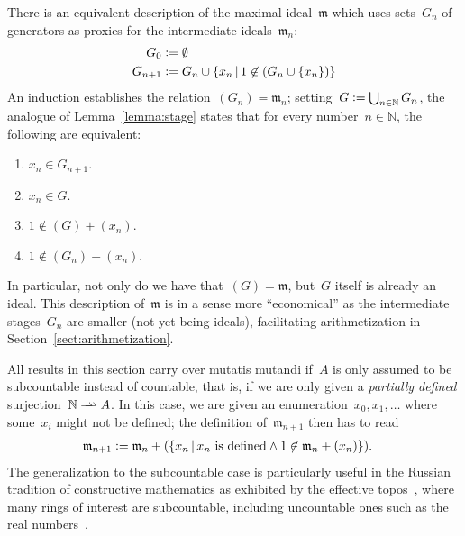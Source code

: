 \documentclass[envcountsect,envcountsame,runningheads]{llncs}
\newcommand{\mmm}{\mathfrak{m}}
\newcommand{\NN}{\mathbb{N}}
\newcommand{\defeq}{\vcentcolon=}
\renewcommand{\_}{\mathpunct{.}\,}
\begin{document}
\begin{remark}\label{rem:via-generators}There is an equivalent description of the
maximal ideal~$\mmm$ which uses sets~$G_n$ of generators as proxies for the
intermediate ideals~$\mmm_n$:
\begin{align*}
  G_0 &\defeq \emptyset \\
  G_{n+1} &\defeq G_n \cup \{ x_n \,|\, 1 \not\in (G_n \cup \{ x_n \}) \}
\end{align*}
An induction establishes the relation~$(G_n) = \mmm_n$; setting~$G \defeq
\bigcup_{n\in\NN} G_n$, the analogue of Lemma~\ref{lemma:stage} states
that for every number~$n \in \NN$, the following are equivalent:
\begin{enumerate}
\item $x_n \in G_{n+1}$.
\item $x_n \in G$.
\item $1 \not\in (G) + (x_n)$.
\item $1 \not\in (G_n) + (x_n)$.
\end{enumerate}
In particular, not only do we have that~$(G) = \mmm$, but~$G$ itself is already
an ideal. This description of~$\mmm$ is in a sense more ``economical'' as the
intermediate stages~$G_n$ are smaller (not yet being ideals), facilitating
arithmetization in Section~\ref{sect:arithmetization}.
\end{remark}

\newcommand{\rightrightharpoonup}{\mathrel{\mathrlap{\rightharpoonup}\mkern1mu\rightharpoonup}}
\begin{remark}All results in this section carry over mutatis mutandi if~$A$ is
only assumed to be subcountable instead of countable, that is, if we are only
given a \emph{partially defined} surjection~$\NN \rightrightharpoonup A$. In
this case, we are given an enumeration~$x_0,x_1,\ldots$ where some~$x_i$
might not be defined; the definition of~$\mmm_{n+1}$ then has to read
\begin{align*}
  \mmm_{n+1} &\defeq \mmm_n + (\{ x_n \,|\, \text{$x_n$ is defined} \wedge 1 \not\in \mmm_n + (x_n) \}).
\end{align*}
The generalization to the subcountable case is particularly useful in the
Russian tradition of constructive mathematics as exhibited by the ef{}fective
topos~\cite{hyland:effective-topos,oosten:realizability,phoa:effective,bauer:c2c},
where many rings of interest are subcountable, including uncountable ones such as the real
numbers~\cite[Prop.~7.2]{hyland:effective-topos}.
\end{remark}
\end{document}
